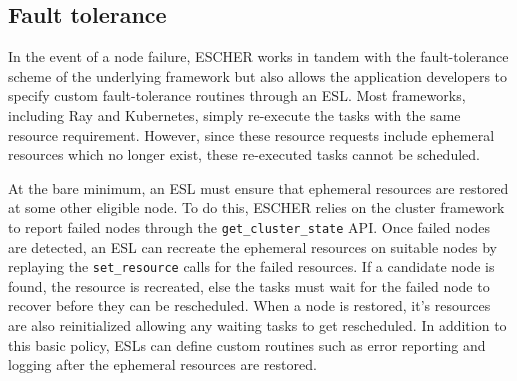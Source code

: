 

\subsection{Fault tolerance}
\label{sec:esl-faulttol}
In the event of a node failure, ESCHER works in tandem with the fault-tolerance scheme of the underlying framework but also allows the application developers to specify custom fault-tolerance routines through an ESL. Most frameworks, including Ray\cite{ray-osdi} and Kubernetes\cite{kubernetes}, simply re-execute the tasks with the same resource requirement. However, since these resource requests include ephemeral resources which no longer exist, these re-executed tasks cannot be scheduled.

At the bare minimum, an ESL must ensure that ephemeral resources are restored at some other eligible node. To do this, ESCHER relies on the cluster framework to report failed nodes through the \lstinline{get_cluster_state} API. Once failed nodes are detected, an ESL can recreate the ephemeral resources on suitable nodes by replaying the \lstinline{set_resource} calls for the failed resources. If a candidate node is found, the resource is recreated, else the tasks must wait for the failed node to recover before they can be rescheduled. When a node is restored, it's resources are also reinitialized allowing any waiting tasks to get rescheduled. In addition to this basic policy, ESLs can define custom routines such as error reporting and logging after the ephemeral resources are restored.